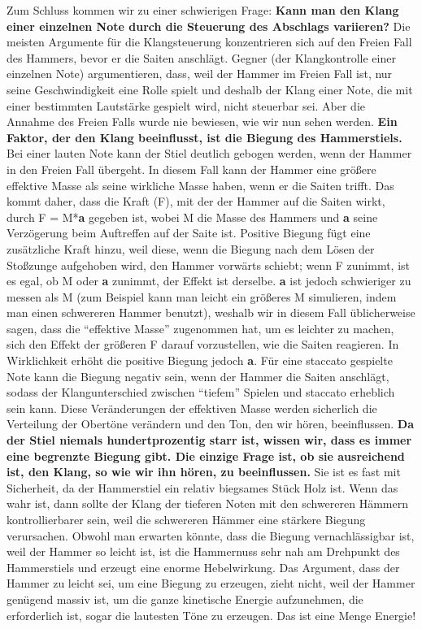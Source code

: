 Zum Schluss kommen wir zu einer schwierigen Frage: \textbf{Kann man den Klang einer einzelnen Note durch die Steuerung des Abschlags variieren?}
Die meisten Argumente für die Klangsteuerung konzentrieren sich auf den Freien Fall des Hammers, bevor er die Saiten anschlägt.
Gegner (der Klangkontrolle einer einzelnen Note) argumentieren, dass, weil der Hammer im Freien Fall ist, nur seine Geschwindigkeit eine Rolle spielt und deshalb der Klang einer Note, die mit einer bestimmten Lautstärke gespielt wird, nicht steuerbar sei.
Aber die Annahme des Freien Falls wurde nie bewiesen, wie wir nun sehen werden.
\textbf{Ein Faktor, der den Klang beeinflusst, ist die Biegung des Hammerstiels.}
Bei einer lauten Note kann der Stiel deutlich gebogen werden, wenn der Hammer in den Freien Fall übergeht.
In diesem Fall kann der Hammer eine größere effektive Masse als seine wirkliche Masse haben, wenn er die Saiten trifft.
Das kommt daher, dass die Kraft (F), mit der der Hammer auf die Saiten wirkt, durch F = M*\textbf{a} gegeben ist, wobei M die Masse des Hammers und \textbf{a} seine Verzögerung beim Auftreffen auf der Saite ist.
Positive Biegung fügt eine zusätzliche Kraft hinzu, weil diese, wenn die Biegung nach dem Lösen der Stoßzunge aufgehoben wird, den Hammer vorwärts schiebt; wenn F zunimmt, ist es egal, ob M oder \textbf{a} zunimmt, der Effekt ist derselbe.
\textbf{a} ist jedoch schwieriger zu messen als M (zum Beispiel kann man leicht ein größeres M simulieren, indem man einen schwereren Hammer benutzt), weshalb wir in diesem Fall üblicherweise sagen, dass die \enquote{effektive Masse} zugenommen hat, um es leichter zu machen, sich den Effekt der größeren F darauf vorzustellen, wie die Saiten reagieren.
In Wirklichkeit erhöht die positive Biegung jedoch \textbf{a}.
Für eine staccato gespielte Note kann die Biegung negativ sein, wenn der Hammer die Saiten anschlägt, sodass der Klangunterschied zwischen \enquote{tiefem} Spielen und staccato erheblich sein kann.
Diese Veränderungen der effektiven Masse werden sicherlich die Verteilung der Obertöne verändern und den Ton, den wir hören, beeinflussen.
\textbf{Da der Stiel niemals hundertprozentig starr ist, wissen wir, dass es immer eine begrenzte Biegung gibt.
Die einzige Frage ist, ob sie ausreichend ist, den Klang, so wie wir ihn hören, zu beeinflussen.}
Sie ist es fast mit Sicherheit, da der Hammerstiel ein relativ biegsames Stück Holz ist.
Wenn das wahr ist, dann sollte der Klang der tieferen Noten mit den schwereren Hämmern kontrollierbarer sein, weil die schwereren Hämmer eine stärkere Biegung verursachen.
Obwohl man erwarten könnte, dass die Biegung vernachlässigbar ist, weil der Hammer so leicht ist, ist die Hammernuss sehr nah am Drehpunkt des Hammerstiels und erzeugt eine enorme Hebelwirkung.
Das Argument, dass der Hammer zu leicht sei, um eine Biegung zu erzeugen, zieht nicht, weil der Hammer genügend massiv ist, um die ganze kinetische Energie aufzunehmen, die erforderlich ist, sogar die lautesten Töne zu erzeugen.
Das ist eine Menge Energie!

